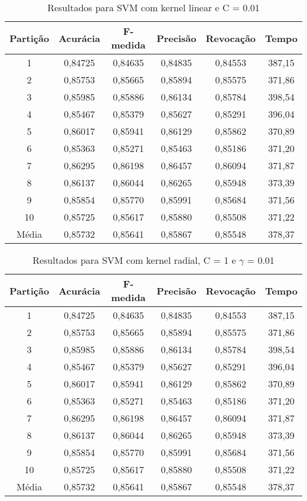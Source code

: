 \begin{table}[h]
\centering
\caption{Resultados para SVM com kernel linear e C = 0.01}
\vspace{0.2cm}
\begin{tabular}{c|c|c|c|c|c}
Partição & Acurácia & F-medida & Precisão & Revocação & Tempo \\
\hline
1  & 0,84725 & 0,84635 & 0,84835 & 0,84553 & 387,15 \\ 
2  & 0,85753 & 0,85665 & 0,85894 & 0,85575 & 371,86 \\
3  & 0,85985 & 0,85886 & 0,86134 & 0,85784 & 398,54 \\
4  & 0,85467 & 0,85379 & 0,85627 & 0,85291 & 396,04 \\
5  & 0,86017 & 0,85941 & 0,86129 & 0,85862 & 370,89 \\
6  & 0,85363 & 0,85271 & 0,85463 & 0,85186 & 371,20 \\
7  & 0,86295 & 0,86198 & 0,86457 & 0,86094 & 371,87 \\
8  & 0,86137 & 0,86044 & 0,86265 & 0,85948 & 373,39 \\
9  & 0,85854 & 0,85770 & 0,85991 & 0,85684 & 371,56 \\
10 & 0,85725 & 0,85617 & 0,85880 & 0,85508 & 371,22 \\
\hline
Média & 0,85732 & 0,85641 & 0,85867 & 0,85548 & 378,37 \\

\end{tabular} 
\label{table:resultadosSVMLinear}
\end{table}

\begin{table}[h]
\centering
\caption{Resultados para SVM com kernel radial, C = 1 e \(\gamma\) = 0.01}
\vspace{0.2cm}
\begin{tabular}{c|c|c|c|c|c}
Partição & Acurácia & F-medida & Precisão & Revocação & Tempo \\
\hline
1  & 0,84725 & 0,84635 & 0,84835 & 0,84553 & 387,15 \\ 
2  & 0,85753 & 0,85665 & 0,85894 & 0,85575 & 371,86 \\
3  & 0,85985 & 0,85886 & 0,86134 & 0,85784 & 398,54 \\
4  & 0,85467 & 0,85379 & 0,85627 & 0,85291 & 396,04 \\
5  & 0,86017 & 0,85941 & 0,86129 & 0,85862 & 370,89 \\
6  & 0,85363 & 0,85271 & 0,85463 & 0,85186 & 371,20 \\
7  & 0,86295 & 0,86198 & 0,86457 & 0,86094 & 371,87 \\
8  & 0,86137 & 0,86044 & 0,86265 & 0,85948 & 373,39 \\
9  & 0,85854 & 0,85770 & 0,85991 & 0,85684 & 371,56 \\
10 & 0,85725 & 0,85617 & 0,85880 & 0,85508 & 371,22 \\
\hline
Média & 0,85732 & 0,85641 & 0,85867 & 0,85548 & 378,37 \\

\end{tabular} 
\label{table:resultadosSVMRadial}
\end{table}


